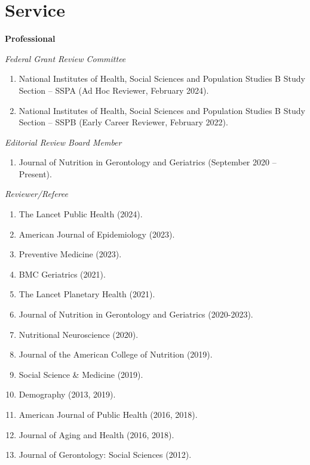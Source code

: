 \documentclass[
]{article}
\providecommand{\tightlist}{%
  \setlength{\itemsep}{0pt}\setlength{\parskip}{0pt}}
\begin{document}
\hypertarget{service}{%
\section{\texorpdfstring{\textbf{Service}}{Service}}\label{service}}

\textbf{Professional}

\emph{Federal Grant Review Committee}

\begin{enumerate}
\def\labelenumi{\arabic{enumi}.}
\tightlist
\item
  National Institutes of Health, Social Sciences and Population Studies
  B Study Section -- SSPA (Ad Hoc Reviewer, February 2024).
\item
  National Institutes of Health, Social Sciences and Population Studies
  B Study Section -- SSPB (Early Career Reviewer, February 2022).
\end{enumerate}

\emph{Editorial Review Board Member}

\begin{enumerate}
\def\labelenumi{\arabic{enumi}.}
\tightlist
\item
  Journal of Nutrition in Gerontology and Geriatrics (September 2020 --
  Present).
\end{enumerate}

\emph{Reviewer/Referee}

\begin{enumerate}
\def\labelenumi{\arabic{enumi}.}
\item
  The Lancet Public Health (2024).
\item
  American Journal of Epidemiology (2023).
\item
  Preventive Medicine (2023).
\item
  BMC Geriatrics (2021).
\item
  The Lancet Planetary Health (2021).
\item
  Journal of Nutrition in Gerontology and Geriatrics (2020-2023).
\item
  Nutritional Neuroscience (2020).
\item
  Journal of the American College of Nutrition (2019).
\item
  Social Science \& Medicine (2019).
\item
  Demography (2013, 2019).
\item
  American Journal of Public Health (2016, 2018).
\item
  Journal of Aging and Health (2016, 2018).
\item
  Journal of Gerontology: Social Sciences (2012).
\end{enumerate}
\end{document}

